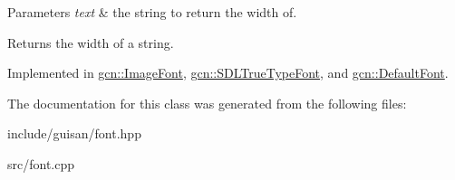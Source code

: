\begin{DoxyParams}{Parameters}
{\em text} & the string to return the width of. \\
\hline
\end{DoxyParams}
\begin{DoxyReturn}{Returns}
the width of a string. 
\end{DoxyReturn}


Implemented in \hyperlink{classgcn_1_1ImageFont_a6432c448c9df16a3ca057b2bd9822663}{gcn\+::\+Image\+Font}, \hyperlink{classgcn_1_1SDLTrueTypeFont_a3389cfeda7002e3888be2731ff8560d7}{gcn\+::\+S\+D\+L\+True\+Type\+Font}, and \hyperlink{classgcn_1_1DefaultFont_a62d609afe7f0d0dec90a0ae1cb4731ea}{gcn\+::\+Default\+Font}.



The documentation for this class was generated from the following files\+:\begin{DoxyCompactItemize}
\item 
include/guisan/font.\+hpp\item 
src/font.\+cpp\end{DoxyCompactItemize}
